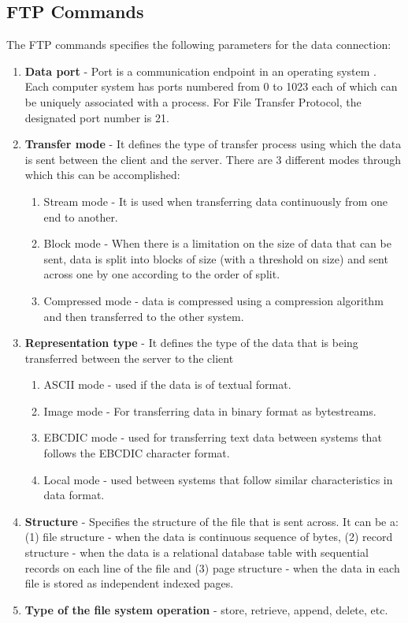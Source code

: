 \documentclass[9pt,twocolumn,twoside]{styles/osajnl}
\begin{document}
\subsection{FTP Commands}
The FTP commands specifies the following parameters for the data connection:
\begin{enumerate}
    \item \textbf{Data port} - Port is a communication endpoint in an operating system \cite{www-wiki-port}. Each computer system has ports numbered from 0 to 1023 each of which can be uniquely associated with a process. For File Transfer Protocol, the designated port number is 21.
    \item \textbf{Transfer mode} - It defines the type of transfer process using which the data is sent between the client and the server. There are 3 different modes through which this can be accomplished:
    \begin{enumerate}
        \item Stream mode - It is used when transferring data continuously from one end to another.
        \item Block mode - When there is a limitation on the size of data that can be sent, data is split into blocks of size (with a threshold on size) and sent across one by one according to the order of split.
        \item Compressed mode - data is compressed using a compression algorithm and then transferred to the other system.
    \end{enumerate}
    \item \textbf{Representation type} - It defines the type of the data that is being transferred between the server to the client
    \begin{enumerate}
    \item ASCII  mode - used if the data is of textual format. 
    \item Image mode - For transferring data in binary format as bytestreams. 
    \item EBCDIC  mode - used for transferring text data between systems that follows the EBCDIC character format.
    \item Local mode - used between systems that follow similar characteristics in data format.
    \end{enumerate}
    \item \textbf{Structure} - Specifies the structure of the file that is sent across. It can be a: (1) file structure - when the data is continuous sequence of bytes, (2) record structure - when the data is a relational database table with sequential records on each line of the file and (3) page structure - when the data in each file is stored as independent indexed pages.  
    \item \textbf{Type of the file system operation} - store, retrieve, append, delete, etc.
\end{enumerate}
\end{document}
